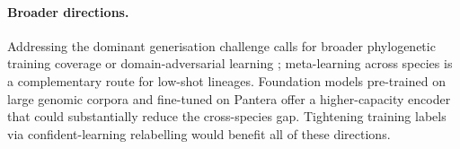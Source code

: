 \documentclass[12pt]{article}
\begin{document}
\paragraph{Broader directions.} Addressing the dominant generisation challenge calls for broader phylogenetic training coverage or domain-adversarial learning \cite{ganin2015unsupervised}; meta-learning across species \cite{finn2017model} is a complementary route for low-shot lineages. Foundation models pre-trained on large genomic corpora and fine-tuned on Pantera \cite{dallatorre2023nucleotide} offer a higher-capacity encoder that could substantially reduce the cross-species gap. Tightening training labels via confident-learning relabelling \cite{northcutt2021confident} would benefit all of these directions.

\newpage
\end{document}
